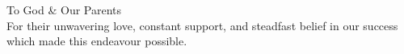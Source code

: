 \begin{dedication}
{\large{To God \& Our Parents}}\\[5mm]
For their unwavering love, constant support, and steadfast belief in our success which made this endeavour possible.
\end{dedication}

